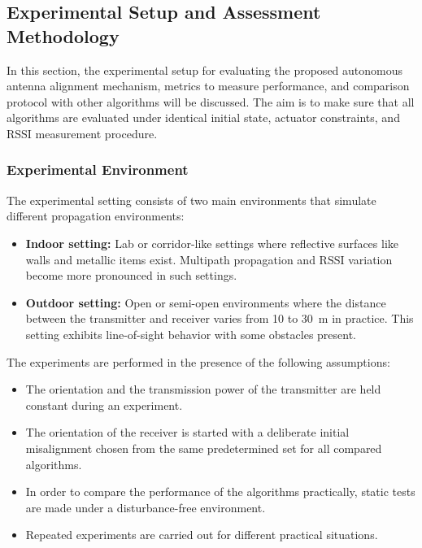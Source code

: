 \subsection{Experimental Setup and Assessment Methodology}

In this section, the experimental setup for evaluating the proposed autonomous antenna
alignment mechanism, metrics to measure performance, and comparison protocol with other
algorithms will be discussed. The aim is to make sure that all algorithms are
evaluated under identical initial state, actuator constraints, and RSSI measurement
procedure.

\subsubsection{Experimental Environment}

The experimental setting consists of two main environments that simulate different
propagation environments:

\begin{itemize}
    \item \textbf{Indoor setting:} Lab or corridor-like settings where reflective
    surfaces like walls and metallic items exist. Multipath propagation and RSSI
    variation become more pronounced in such settings.
    \item \textbf{Outdoor setting:} Open or semi-open environments where the
    distance between the transmitter and receiver varies from 10 to 30~m in practice.
    This setting exhibits line-of-sight behavior with some obstacles present.
\end{itemize}

The experiments are performed in the presence of the following assumptions:
\begin{itemize}
    \item The orientation and the transmission power of the transmitter are held
    constant during an experiment.
    \item The orientation of the receiver is started with a deliberate initial misalignment
    chosen from the same predetermined set for all compared algorithms.
    \item In order to compare the performance of the algorithms practically, static tests
    are made under a disturbance-free environment.
    \item Repeated experiments are carried out for different practical situations.
\end{itemize}

